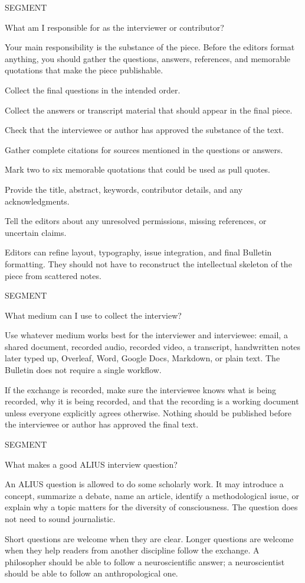 \documentclass[11pt]{article}
\newcommand{\GuideSansLight}{\sffamily}
\newcommand{\GuideSansRegular}{\sffamily}
\newcommand{\GuideSerif}{\rmfamily}
\newcounter{guideprompt}
\newcommand{\guidePrompt}[1]{%
  \Needspace{7\baselineskip}%
  \stepcounter{guideprompt}%
  \par\vspace{1.25em}%
  {\GuideSansLight\fontsize{9}{11}\selectfont\color{aliusgray}\MakeUppercase{Segment \theguideprompt}}\par
  {\GuideSansRegular\fontsize{17}{21}\selectfont\color{aliusgreen}#1\par}
  \vspace{0.35em}
}
\newenvironment{guideAnswerBlock}
  {\begingroup\GuideSerif\fontsize{12.4}{16.8}\selectfont\setlength{\parskip}{0.55em}\color{black}}
  {\par\endgroup}
\begin{document}
\guidePrompt{What am I responsible for as the interviewer or contributor?}
\begin{guideAnswerBlock}
Your main responsibility is the substance of the piece. Before the editors format anything, you should gather the questions, answers, references, and memorable quotations that make the piece publishable.

\begin{guideChecklist}
\item Collect the final questions in the intended order.
\item Collect the answers or transcript material that should appear in the final piece.
\item Check that the interviewee or author has approved the substance of the text.
\item Gather complete citations for sources mentioned in the questions or answers.
\item Mark two to six memorable quotations that could be used as pull quotes.
\item Provide the title, abstract, keywords, contributor details, and any acknowledgments.
\item Tell the editors about any unresolved permissions, missing references, or uncertain claims.
\end{guideChecklist}

Editors can refine layout, typography, issue integration, and final Bulletin formatting. They should not have to reconstruct the intellectual skeleton of the piece from scattered notes.
\end{guideAnswerBlock}

\guidePrompt{What medium can I use to collect the interview?}
\begin{guideAnswerBlock}
Use whatever medium works best for the interviewer and interviewee: email, a shared document, recorded audio, recorded video, a transcript, handwritten notes later typed up, Overleaf, Word, Google Docs, Markdown, or plain text. The Bulletin does not require a single workflow.

If the exchange is recorded, make sure the interviewee knows what is being recorded, why it is being recorded, and that the recording is a working document unless everyone explicitly agrees otherwise. Nothing should be published before the interviewee or author has approved the final text.
\end{guideAnswerBlock}

\guidePrompt{What makes a good ALIUS interview question?}
\begin{guideAnswerBlock}
An ALIUS question is allowed to do some scholarly work. It may introduce a concept, summarize a debate, name an article, identify a methodological issue, or explain why a topic matters for the diversity of consciousness. The question does not need to sound journalistic.

Short questions are welcome when they are clear. Longer questions are welcome when they help readers from another discipline follow the exchange. A philosopher should be able to follow a neuroscientific answer; a neuroscientist should be able to follow an anthropological one.
\end{guideAnswerBlock}
\end{document}
